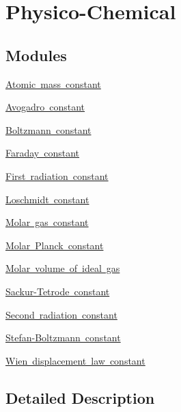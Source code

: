 \hypertarget{group___n_i_s_t_const-_physico_chemical}{}\section{Physico-\/\+Chemical}
\label{group___n_i_s_t_const-_physico_chemical}
\subsection*{Modules}
\begin{DoxyCompactItemize}
\item 
\mbox{\hyperlink{group___n_i_s_t_const-_atomic_mass_constant}{Atomic mass constant}}
\item 
\mbox{\hyperlink{group___n_i_s_t_const-_avogadro_constant}{Avogadro constant}}
\item 
\mbox{\hyperlink{group___n_i_s_t_const-_boltzmann_constant}{Boltzmann constant}}
\item 
\mbox{\hyperlink{group___n_i_s_t_const-_faraday_constant}{Faraday constant}}
\item 
\mbox{\hyperlink{group___n_i_s_t_const-_first_radiation_constant}{First radiation constant}}
\item 
\mbox{\hyperlink{group___n_i_s_t_const-_loschmidt_constant}{Loschmidt constant}}
\item 
\mbox{\hyperlink{group___n_i_s_t_const-_molar_gas_constant}{Molar gas constant}}
\item 
\mbox{\hyperlink{group___n_i_s_t_const-_molar_planck_constant}{Molar Planck constant}}
\item 
\mbox{\hyperlink{group___n_i_s_t_const-_molar_volume}{Molar volume of ideal gas}}
\item 
\mbox{\hyperlink{group___n_i_s_t_const-_sackur_tetrode_constant}{Sackur-\/\+Tetrode constant}}
\item 
\mbox{\hyperlink{group___n_i_s_t_const-_second_radiation_constant}{Second radiation constant}}
\item 
\mbox{\hyperlink{group___n_i_s_t_const-_stefan_boltzmann_constant}{Stefan-\/\+Boltzmann constant}}
\item 
\mbox{\hyperlink{group___n_i_s_t_const-_wien_displacement}{Wien displacement law constant}}
\end{DoxyCompactItemize}


\subsection{Detailed Description}

